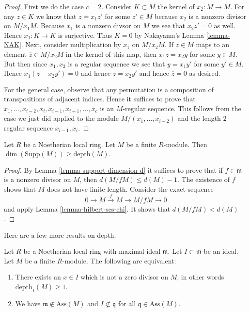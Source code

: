 \begin{proof}
First we do the case $c=2$.
Consider $K \subset M$ the kernel of $x_2 : M \to M$.
For any $z \in K$ we know that $z = x_1 z'$
for some $z' \in M$ because
$x_2$ is a nonzero divisor on $M/x_1M$. 
Because $x_1$ is a nonzero divsor on $M$ we see that $x_2 z' = 0$
as well. Hence $x_1 : K \to K$ is surjective.
Thus $K = 0$ by Nakayama's Lemma \ref{lemma-NAK}.
Next, consider multiplication by $x_1$ on $M/x_2M$.
If $z \in M$ maps to an element $\overline{z} \in M/x_2M$
in the kernel of this map, then $x_1 z = x_2 y$ for some $y \in M$.
But then since $x_1, x_2$ is a regular sequence we see that
$y = x_1 y'$ for some $y' \in M$. Hence $x_1 ( z - x_2 y' ) =0$
and hence $z = x_2 y'$ and hence $\overline{z} = 0$ as desired.

\medskip\noindent
For the general case, observe that any permutation is
a composition of transpositions of adjacent indices.
Hence it suffices to prove that
$x_1,\ldots,x_{i-2},x_i,x_{i-1},x_{i+1},\ldots,x_c$ 
is an $M$-regular sequence. This follows from the case we 
just did applied to the module $M/(x_1,\ldots,x_{i-2})$
and the length $2$ regular sequence $x_{i-1}, x_i$.
\end{proof}

\begin{lemma}
\label{lemma-bound-depth}
Let $R$ be a Noetherian local ring.
Let $M$ be a finite $R$-module.
Then $\dim(\text{Supp}(M)) \geq \text{depth}(M)$.
\end{lemma}

\begin{proof}
By Lemma \ref{lemma-support-dimension-d} it suffices
to prove that if $f \in \mathfrak m$ is a nonzero
divisor on $M$, then $d(M/fM) \leq d(M) - 1$.
The existence of $f$ shows that $M$ does not have finite length.
Consider the exact sequence
$$
0 \to M \xrightarrow{f} M \to M/fM \to 0
$$
and apply Lemma \ref{lemma-hilbert-ses-chi}.
It shows that $d(M/fM) < d(M)$.
\end{proof}

\noindent
Here are a few more results on depth.

\begin{lemma}
\label{lemma-ideal-nonzerodivisor}
Let $R$ be a Noetherian local ring with
maximal ideal $\mathfrak m$. Let $I \subset \mathfrak m$
be an ideal. Let $M$ be a finite $R$-module.
The following are equivalent:
\begin{enumerate}
\item There exists an $x \in I$ which is not a zero
divisor on $M$, in other words $\text{depth}_I(M) \geq 1$.
\item We have $\mathfrak m \not\in \text{Ass}(M)$ and
$I \not \subset \mathfrak q$ for all $\mathfrak q \in \text{Ass}(M)$.
\end{enumerate}
\end{lemma}

